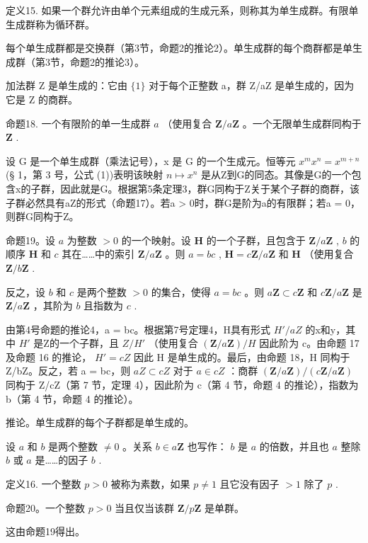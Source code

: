 定义15. 如果一个群允许由单个元素组成的生成元系，则称其为单生成群。有限单生成群称为循环群。

每个单生成群都是交换群（第3节，命题2的推论2）。单生成群的每个商群都是单生成群（第3节，命题2的推论3）。

加法群 Z 是单生成的：它由 \(\{1\}\) 对于每个正整数 a，群 Z/aZ 是单生成的，因为它是 Z 的商群。

命题18. 一个有限阶的单一生成群 \(a\) （使用复合 \(\mathbf{Z}/a\mathbf{Z}\) 。一个无限单生成群同构于 \(\mathbf{Z}\) .

设 G 是一个单生成群（乘法记号），x 是 G 的一个生成元。恒等元 \(x^{m}x^{n} = x^{m+n}\) (§ 1，第 3 号，公式 (1))表明该映射 \(n \mapsto x^{n}\) 是从Z到G的同态。其像是G的一个包含x的子群，因此就是G。根据第5条定理3，群G同构于Z关于某个子群的商群，该子群必然具有aZ的形式（命题17）。若a \textgreater{} 0时，群G是阶为a的有限群；若a = 0，则群G同构于Z。

命题19。设 \(a\) 为整数 \(>0\) 的一个映射。设 \(\mathbf{H}\) 的一个子群，且包含于 \(\mathbf{Z}/a\mathbf{Z}\) , \(b\) 的顺序 \(\mathbf{H}\) 和 \(c\) 其在……中的索引 \(\mathbf{Z}/a\mathbf{Z}\) 。则 \(a = bc\) , \(\mathbf{H} = c\mathbf{Z}/a\mathbf{Z}\) 和 \(\mathbf{H}\) （使用复合 \(\mathbf{Z}/b\mathbf{Z}\) .

反之，设 \(b\) 和 \(c\) 是两个整数 \(>0\) 的集合，使得 \(a = bc\) 。则 \(a\mathbf{Z} \subset c\mathbf{Z}\) 和 \(c\mathbf{Z}/a\mathbf{Z}\) 是 \(\mathbf{Z}/a\mathbf{Z}\) ，其阶为 \(b\) 且指数为 \(c\) .

由第4号命题的推论4，a = bc。根据第7号定理4，H具有形式 \(H'/aZ\) 的x和y，其中 \(H'\) 是Z的一个子群，且 \(Z/H'\) （使用复合 \((\mathbf{Z}/a\mathbf{Z})/H\) 因此阶为 c。由命题 17 及命题 16 的推论， \(H' = cZ\) 因此 H 是单生成的。最后，由命题 18，H 同构于 Z/bZ。反之，若 a = bc，则 \(aZ \subset cZ\) 对于 \(a \in cZ\) ：商群 \((\mathbf{Z}/a\mathbf{Z})/(c\mathbf{Z}/a\mathbf{Z})\) 同构于 Z/cZ（第 7 节，定理 4），因此阶为 c（第 4 节，命题 4 的推论），指数为 b（第 4 节，命题 4 的推论）。

推论。单生成群的每个子群都是单生成的。

设 \(a\) 和 \(b\) 是两个整数 \(\neq 0\) 。关系 \(b \in a\mathbf{Z}\) 也写作： \(b\) 是 \(a\) 的倍数，并且也 \(a\) 整除 \(b\) 或 \(a\) 是……的因子 \(b\) .

定义16. 一个整数 \(p > 0\) 被称为素数，如果 \(p \neq 1\) 且它没有因子 \(> 1\) 除了 \(p\) .

命题20。一个整数 \(p > 0\) 当且仅当该群 \(\mathbf{Z} / p\mathbf{Z}\) 是单群。

这由命题19得出。

